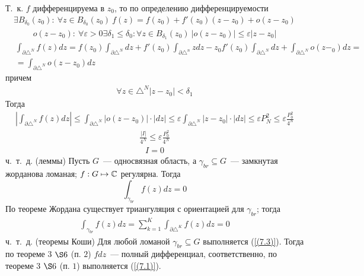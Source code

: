 Т.~к. $f$ дифференцируема в $z_0$, то по определению дифференцируемости
\begin{align*}
  \exists B_{\delta_0}(z_0): \ \forall z \in B_{\delta_0}(z_0) \ f(z) = f(z_0)+f'(z_0)(z-z_0) + o(z-z_0)
\end{align*}
\begin{align*}
  o(z-z_0): \ \forall \varepsilon > 0 \exists \delta_1 \leq \delta_0: \forall z \in B_{\delta_1}(z_0) \ \left| o(z-z_0) \right| \leq \varepsilon\left| z-z_0 \right|
\end{align*}
\begin{align*}
  & \int_{\partial \triangle^N}f(z)dz = f(z_0)\int_{\partial \triangle^N}dz+f'(z_0)\int_{\partial \triangle^n}zdz - z_0 f'(z_0)\int_{\partial \triangle^N} dz + \int_{\partial \triangle^N}o(z-_0)dz = \\
  & = \int_{\partial \triangle^N}o(z-z_0)dz
\end{align*}
причем
\begin{align*}
  \forall z \in \triangle^N \left| z-z_0 \right| < \delta_1
\end{align*}
Тогда
\begin{align*}
  \left| \int_{\partial \triangle^N}f(z)dz \right| \leq \int_{\partial \triangle^N} \left| o(z-z_0) \right|\cdot \left| dz \right| \leq \varepsilon\int_{\partial\triangle^N}\left| z-z_0 \right|\cdot\left| dz \right| \leq \varepsilon P^2_N \leq \varepsilon \frac{P^2_0}{4^N}
\end{align*}
\begin{align*}
  \frac{\left| I \right|}{4^N} \leq \varepsilon \frac{P^2_0}{4^N}
\end{align*}
\begin{align*}
  I = 0
\end{align*}
ч.~т.~д.
\corollary (леммы)
Пусть $G$~--- односвязная область, а $\gamma_{br} \subseteq
G$~--- замкнутая жорданова ломаная; $f:G \mapsto \mathbb{C}$ регулярна. Тогда
\begin{equation} \label{(7.3)}
  \int_{\gamma_{br}} f(z)dz = 0
\end{equation}
\pr
По теореме Жордана существует триангуляция с ориентацией для $\gamma_{br}$;
тогда 
\begin{align*}
  \int_{\gamma_{br}} f(z)dz = \sum_{k=1}^K\int_{\partial\triangle^K}f(z)dz = 0
\end{align*}
ч.~т.~д.
\pr (теоремы Коши)
Для любой ломаной $\gamma_{br}\subseteq G$ выполняется (\ref{(7.3)}).
Тогда по теореме $3$ $\S 6$ (п. $2$) $f dz$~--- полный дифференциал,
соответственно, по теореме $3$ $\S 6$ (п. $1$) выполняется (\ref{(7.1)}).
